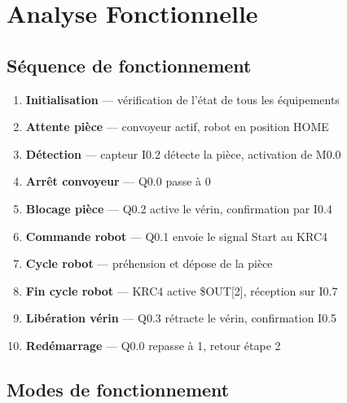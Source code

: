 \documentclass[12pt, a4paper]{report}
\begin{document}
\chapter{Analyse Fonctionnelle}
\label{chap:fonc}

\section{S\'equence de fonctionnement}

\begin{enumerate}[label=\textbf{\'Etape \arabic*~:}, leftmargin=*, wide, itemsep=6pt]
  \item \textbf{Initialisation} --- v\'erification de l'\'etat de tous les \'equipements
  \item \textbf{Attente pi\`ece} --- convoyeur actif, robot en position HOME
  \item \textbf{D\'etection} --- capteur I0.2 d\'etecte la pi\`ece, activation de M0.0
  \item \textbf{Arr\^et convoyeur} --- Q0.0 passe \`a 0
  \item \textbf{Blocage pi\`ece} --- Q0.2 active le v\'erin, confirmation par I0.4
  \item \textbf{Commande robot} --- Q0.1 envoie le signal Start au KRC4
  \item \textbf{Cycle robot} --- pr\'ehension et d\'epose de la pi\`ece
  \item \textbf{Fin cycle robot} --- KRC4 active \$OUT[2], r\'eception sur I0.7
  \item \textbf{Lib\'eration v\'erin} --- Q0.3 r\'etracte le v\'erin, confirmation I0.5
  \item \textbf{Red\'emarrage} --- Q0.0 repasse \`a 1, retour \'etape 2
\end{enumerate}

\section{Modes de fonctionnement}
\end{document}
